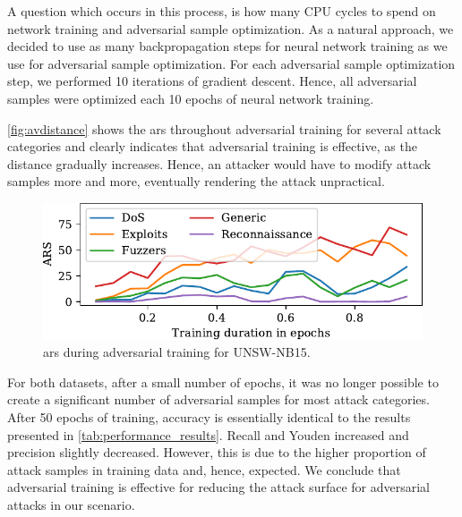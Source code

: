 \documentclass[conference]{IEEEtran}
\newcommand\note[2]{{\color{#1}#2}}
\newcommand\todo[1]{{\note{red}{TODO: #1}}}
\begin{document}
A question which occurs in this process, is how many CPU cycles to spend on network training and adversarial sample optimization. As a natural approach, we decided to use as many backpropagation steps for neural network training as we use for adversarial sample optimization.  For each adversarial sample optimization step, we performed 10 iterations of gradient descent. Hence, all adversarial samples were optimized each 10 epochs of neural network training.

\autoref{fig:avdistance} shows the \gls{ars} throughout  adversarial training  for several attack categories and clearly indicates that adversarial training is effective, as the distance gradually increases. Hence, an attacker would have to modify attack samples more and more, eventually rendering the attack unpractical.




\begin{figure}
\includegraphics[width=\columnwidth]{../plots/ars/ars_15.pdf}
\caption{\gls{ars} during adversarial training for UNSW-NB15.}
\label{fig:avdistance}
\end{figure}

For both datasets, after a small number of epochs, it was no longer possible to create a significant number of adversarial samples for most attack categories. %
After 50 epochs of training, accuracy is essentially identical to the results presented in \autoref{tab:performance_results}. Recall and Youden increased and precision slightly decreased. However, this is due to the higher proportion of attack samples in training data and, hence, expected.
We conclude that adversarial training is effective for reducing the attack surface for adversarial attacks in our scenario.
\end{document}
